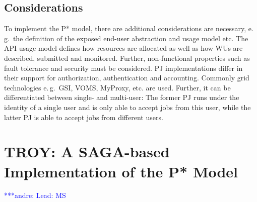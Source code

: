 \documentclass[conference,final]{IEEEtran}
\newcommand{\jhanote}[1]{ {\textcolor{red} { ***shantenu: #1 }}}
\newcommand{\alnote}[1]{ {\textcolor{blue} { ***andre: #1 }}}
\newcommand{\msnote}[1]{ {\textcolor{cyan} { ***mark: #1 }}}
\newcommand{\alnote}[1]{}
\newcommand{\jhanote}[1]{}
\newcommand{\msnote}[1]{}
\newcommand{\upp}{\vspace*{-0.5em}}
\begin{document}
\upp
\subsection{Considerations\upp\upp}




To implement the P* model, there are additional considerations are necessary,
e.\,g.\ the definition of the exposed end-user abstraction and usage model etc.
The API usage model defines how resources are allocated as well as how WUs are
described, submitted and monitored. Further, non-functional properties such as
fault tolerance and security must be considered. PJ implementations differ in
their support for authorization, authentication and accounting. Commonly grid
technologies e.\,g.\ GSI, VOMS, MyProxy, etc. are used. Further, it can be
differentiated between single- and multi-user: The former PJ runs under the
identity of a single user and is only able to accept jobs from this user, while
the latter PJ is able to accept jobs from different users.



\section{TROY: A SAGA-based Implementation of the P* Model\upp\upp}
\alnote{Lead: MS}

\end{document}

